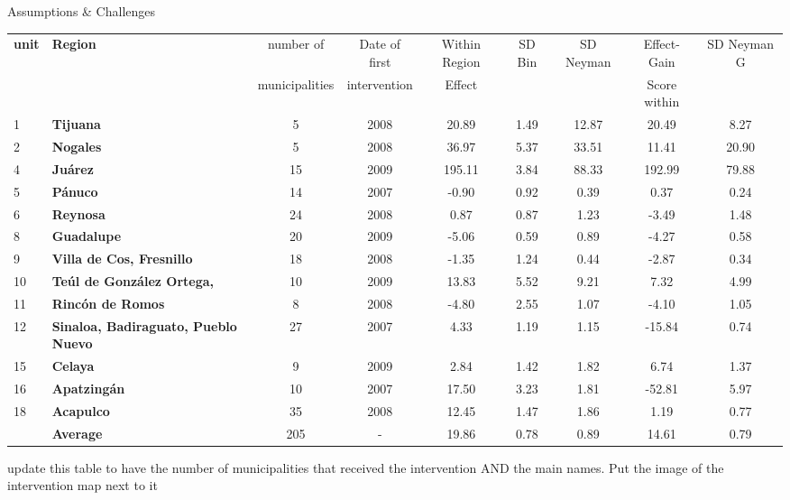 \documentclass[final]{beamer}
\newlength{\threecolwid}
\begin{document}
\begin{frame}[t]
\begin{columns}[t]
\begin{column}{\threecolwid}
\begin{block}{Assumptions \& Challenges}
\begin{itemize}
\begin{itemize}
            \begin{table}[ht]
              \begin{center}
		\begin{tabular}{llccccccc}
		  \hline
                  \textbf{unit}& \textbf{Region}& number of& Date of first & Within Region & SD Bin& SD Neyman &Effect- Gain&SD Neyman G\\
                  && municipalities& intervention& Effect&&& Score within&\\
		  \hline
                  1&\textbf{Tijuana} &   5 & 2008 &20.89 & 1.49 & 12.87&20.49 & 8.27 \\  
		2&		  \textbf{Nogales} &   5 & 2008 &36.97 & 5.37 & 33.51& 11.41 & 20.90 \\
		4&		  \textbf{Ju\'{a}rez} &  15 & 2009 & 195.11 & 3.84 & 88.33 & 192.99 & 79.88 \\   
		5&		  \textbf{P\'{a}nuco} &  14 & 2007 &  -0.90 & 0.92 & 0.39& 0.37 & 0.24 \\
		6&		  \textbf{Reynosa} &  24 & 2008 &  0.87 & 0.87 & 1.23  & -3.49 & 1.48 \\  
		8&		  \textbf{Guadalupe} &  20 & 2009 &  -5.06 & 0.59 & 0.89 & -4.27 & 0.58 \\  
		9&		  \textbf{Villa de Cos, Fresnillo} &  18 & 2008 &-1.35 & 1.24 & 0.44 & -2.87 & 0.34 \\  
		10&		\textbf{Te\'{u}l de Gonz\'{a}lez Ortega,} &10 & 2009&13.83 & 5.52 & 9.21& 7.32 & 4.99 \\ 
		11&		\textbf{Rinc\'{o}n de Romos} & 8 & 2008&-4.80 & 2.55 & 1.07& -4.10 & 1.05\\
		12&		\textbf{Sinaloa, Badiraguato, Pueblo Nuevo} &27 & 2007& 4.33 & 1.19 & 1.15 & -15.84 & 0.74 \\ 
		15&		\textbf{Celaya} &9 & 2009  &2.84 & 1.42 & 1.82& 6.74 & 1.37 \\ 
		16&		\textbf{Apatzing\'{a}n} &10 & 2007 &17.50 & 3.23 & 1.81 &-52.81 & 5.97 \\  
		18&		\textbf{Acapulco} &35 & 2008 & 12.45 & 1.47 & 1.86 & 1.19 & 0.77 \\ 
		&		 \textbf{Average}& 205& - &19.86& 0.78&  0.89&14.61& 0.79\\
		\hline
              \end{tabular}
            \end{center}
          \end{table}
          update this table to have the number of municipalities that received the intervention AND the main names.
          Put the image of the intervention map next to it
        \end{itemize}
 

\end{itemize}
\end{block}
\end{column}
\end{columns}
\end{frame}
\end{document}
